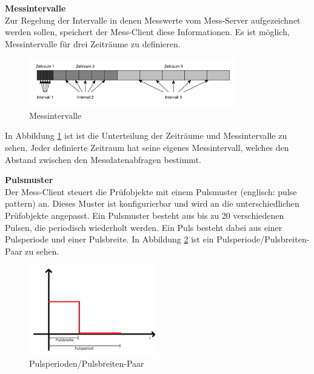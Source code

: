 \textbf{Messintervalle}\\
Zur Regelung der Intervalle in denen Messwerte vom Mess-Server aufgezeichnet werden sollen, speichert der Mess-Client diese Informationen. Es ist möglich, Messintervalle für drei Zeiträume zu definieren.



\begin{figure}[H]
\begin{center}
\includegraphics[width=0.8\textwidth]{img/general/Messintervalle.pdf}
\caption{Messintervalle}
\label{figure_Messintervalle}
\end{center}
\end{figure}

In Abbildung \ref{figure_Messintervalle} ist ist die Unterteilung der Zeiträume und Messintervalle zu sehen. Jeder definierte Zeitraum hat seine eigenes Messintervall, welches den Abstand zwischen den Messdatenabfragen bestimmt.\ 

\textbf{Pulsmuster}\\
Der Mess-Client steuert die Prüfobjekte mit einem Pulsmuster (englisch: pulse pattern) an. Dieses Muster ist konfigurierbar und wird an die unterschiedlichen Prüfobjekte angepasst. Ein Pulsmuster besteht aus bis zu 20 verschiedenen Pulsen, die periodisch wiederholt werden. Ein Puls besteht dabei aus einer Pulsperiode und einer Pulsbreite. In Abbildung \ref{figure_Pulsepattern} ist ein Pulsperiode/Pulsbreiten-Paar zu sehen.\\



\begin{figure}[H]
\begin{center}
\includegraphics[width=0.5\textwidth]{img/general/PulseMuster.png}
\caption{Pulsperioden/Pulsbreiten-Paar}
\label{figure_Pulsepattern}
\end{center}
\end{figure}


